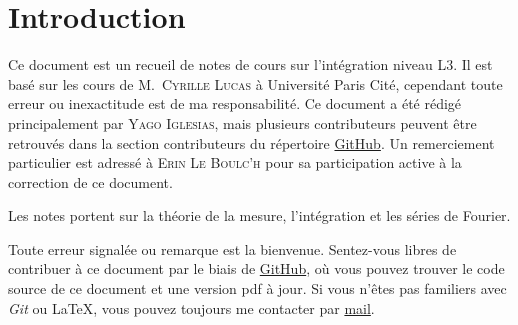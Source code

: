 \section{Introduction}

Ce document est un recueil de notes de cours sur l'intégration niveau L3. Il est
basé sur les cours de M.~\textsc{Cyrille Lucas} à Université Paris Cité, cependant toute
erreur ou inexactitude est de ma responsabilité.
Ce document a été rédigé principalement par \textsc{Yago Iglesias}, mais plusieurs contributeurs
peuvent être retrouvés dans la section contributeurs du répertoire
\href{https://github.com/Yag000/integration-notes/graphs/contributors}{GitHub}. Un remerciement
particulier est adressé à \textsc{Erin Le Boulc'h} pour sa participation active à la correction
de ce document.
\vspace{0.5cm}

Les notes portent sur la théorie de la mesure, l'intégration et les séries de Fourier.
\vspace{0.5cm}

Toute erreur signalée ou remarque est la bienvenue.
Sentez-vous libres de contribuer à ce document par le biais de \href{https://github.com/Yag000/integration-notes}{GitHub},
où vous pouvez trouver le code source de ce document et une version pdf à jour.
Si vous n'êtes pas familiers avec \textit{Git} ou \LaTeX, vous pouvez toujours me contacter
par \href{mailto: yago.iglesias.vazquez@gmail.com}{mail}.








